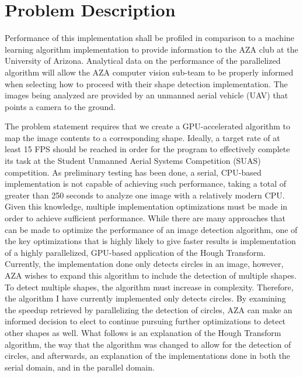 \documentclass[conference]{IEEEtran}
\begin{document}
\section{Problem Description} 
Performance of this implementation shall be profiled in comparison to a machine learning algorithm implementation to provide information to the AZA club at the University of Arizona.
Analytical data on the performance of the parallelized algorithm will allow the AZA computer vision sub-team to be properly informed when selecting how to proceed with their shape detection implementation. 
The images being analyzed are provided by an unmanned aerial vehicle (UAV) that points a camera to the ground.


The problem statement requires that we create a GPU-accelerated algorithm to map the image contents to a corresponding shape.
Ideally, a target rate of at least 15 FPS should be reached in order for the program to effectively complete its task at the Student Unmanned Aerial Systems Competition (SUAS) competition.
As preliminary testing has been done, a serial, CPU-based implementation is not capable of achieving such performance, taking a total of greater than 250 seconds to analyze one image with a relatively modern CPU\@.
Given this knowledge, multiple implementation optimizations must be made in order to achieve sufficient performance. 
While there are many approaches that can be made to optimize the performance of an image detection algorithm, one of the key optimizations that is highly likely to give faster results is implementation of a highly parallelized, GPU-based application of the Hough Transform.
Currently, the implementation done only detects circles in an image, however, AZA wishes to expand this algorithm to include the detection of multiple shapes. 
To detect multiple shapes, the algorithm must increase in complexity. 
Therefore, the algorithm I have currently implemented only detects circles. 
By examining the speedup retrieved by parallelizing the detection of circles, AZA can make an informed decision to elect to continue pursuing further optimizations to detect other shapes as well. 
What follows is an explanation of the Hough Transform algorithm, the way that the algorithm was changed to allow for the detection of circles, and afterwards, an explanation of the implementations done in both the serial domain, and in the parallel domain.
\end{document}
